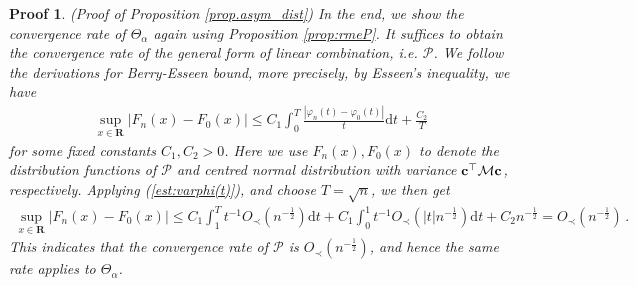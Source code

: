 \documentclass[12pt]{article}
\numberwithin{equation}{section}
\newtheorem{myPro}{Proof}
\theoremstyle{remark}
\newcommand{\1}{{\rm 1}\kern-0.24em{\rm I}}
\begin{document}
\begin{appendices}
\begin{myPro}{(Proof of Proposition \ref{prop.asym_dist})}
In the end, we show the convergence rate of ${\varTheta_{\alpha}}$ again using Proposition \ref{prop:rmeP}. It suffices to obtain the convergence rate of the general form of linear combination, i.e. $\mathcal{P}$. We follow the derivations for  Berry-Esseen bound, more precisely, by Esseen's inequality, we have
\begin{align*}
\sup_{x\in \mathbf{R}} \big|F_n(x)- F_0(x) \big| \leq C_1 \int_{0}^T \frac{|\varphi_n(t)- \varphi_0(t)|}{t} \mathrm{d} t + \frac{C_2}{ T}
\end{align*}
for some fixed constants $C_1, C_2>0$. Here we use $F_n(x), F_0(x)$ to denote the distribution functions of $\mathcal{P}$ and centred normal distribution with variance ${\bf c}^{\top} \mathcal{M} {\bf c}$, respectively.  Applying (\ref{est:varphi(t)}), and choose $T=\sqrt n$, we then get 
\begin{align*}
\sup_{x\in \mathbf{R}} \big|F_n(x)- F_0(x) \big| \leq C_1 \int_{1}^T t^{-1} O_\prec(n^{-\frac12})  \mathrm{d} t +   C_1 \int_{0}^1 t^{-1} O_\prec(|t|n^{-\frac12})  \mathrm{d} t +  C_2 n^{-\frac 12}= O_\prec (n^{-\frac 12})\,.
\end{align*}
This indicates that the convergence rate of $\mathcal{P}$ is $O_\prec (n^{-\frac 12})$, and hence the same rate applies to ${\varTheta_{\alpha}}$.

\end{myPro}
\end{appendices}
\end{document}
